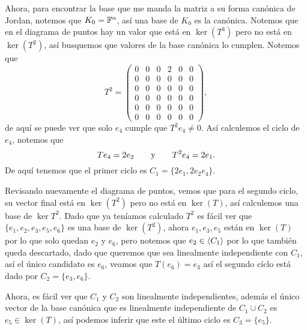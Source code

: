 \begin{example}
  Ahora, para encontrar la base que me manda la matriz a su forma canónica de Jordan, notemos que $K_0 = \mathbb{F}^n$, así una base de $K_0$ es la canónica. Notemos que en el diagrama de puntos hay un valor que está en $\ker(T^3)$ pero no está en $\ker(T^2)$, así busquemos que valores de la base canónica lo cumplen. Notemos que
    \[
      T^2 = \begin{pmatrix} 0 & 0 & 0 & 2 & 0 & 0 \\ 0 & 0 & 0 & 0 & 0 & 0 \\ 0 & 0 & 0 & 0 & 0 & 0 \\ 0 & 0 & 0 & 0 & 0 &0 \\ 0 & 0 & 0 & 0 & 0 & 0 \\ 0 & 0 & 0 & 0 & 0 & 0 \end{pmatrix},
    \]
  de aquí se puede ver que solo $e_4$ cumple que $T^2e_4 \neq 0$. Así calculemos el ciclo de $e_4$, notemos que
  \[
    Te_4 = 2e_2 \qquad\text{y}\qquad T^2e_4 = 2e_1.
  \]
  De aquí tenemos que el primer ciclo es $C_1 = \{2e_1, 2e_2 e_4\}$. 

  Revisando nuevamente el diagrama de puntos, vemos que para el segundo ciclo, su vector final está en $\ker(T^2)$ pero no está en $\ker(T)$, así calculemos una base de $\ker T^2$. Dado que ya teníamos calculado $T^2$  es fácil ver que  $ \{ e_1, e_2, e_3, e_5, e_6 \} $ es una base de $\ker(T^2)$, ahora $e_1, e_3, e_5$ están en $\ker(T)$ por lo que solo quedan $e_2$ y $e_6$, pero notemos que $e_2 \in \langle C_1\rangle$ por lo que también queda descartado, dado que queremos que sea linealmente independiente con $C_1$, así el único candidato es $e_6$, veamos que $T(e_6) = e_3$ así el segundo cíclo está dado por $C_2 = \{e_3, e_6\}$.

  Ahora, es fácil ver que $C_1$ y $C_2$ son linealmente independientes, además el único vector de la base canónica que es linealmente independiente de  $C_1 \cup C_2$ es $e_5 \in \ker(T)$, así podemos inferir que este el último ciclo es $C_3 = \{e_5\}$. 


\end{example}
